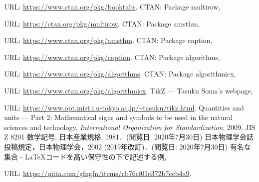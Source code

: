 \documentclass[uplatex]{jsreport}
\begin{document}
\begin{thebibliography}{99}
  URL: \url{https://www.ctan.org/pkg/booktabs}.
   CTAN: Package multirow, \par
  URL: \url{https://ctan.org/pkg/multirow}.
   CTAN: Package amsthm, \par
  URL: \url{https://www.ctan.org/pkg/amsthm}.
   CTAN: Package caption, \par
  URL: \url{https://www.ctan.org/pkg/caption}.
   CTAN: Package algorithms, \par
  URL: \url{https://www.ctan.org/pkg/algorithms}.
   CTAN: Package algorithmicx, \par
  URL: \url{https://www.ctan.org/pkg/algorithmicx}.
   TikZ --- Tasuku Soma's webpage, \par
  URL: \url{https://www.opt.mist.i.u-tokyo.ac.jp/~tasuku/tikz.html}.
   Quantities and units --- Part 2: Mathematical signs and symbols to be used in the natural sciences and technology, \textit{International Organization for Standardization}, 2009.
   JIS Z 8201 数学記号, 日本産業規格, 1981．(閲覧日: 2020年7月30日)
   日本物理学会誌投稿規定，日本物理学会，2002 (2019年改訂)．(閲覧日: 2020年7月30日)
   有名な集合 - LaTeXコードを高い保守性の下で記述する例, \par
  URL: \url{https://qiita.com/gfngfn/items/cb76cf01c372b7ccb4a9}.
\end{thebibliography}
\end{document}
